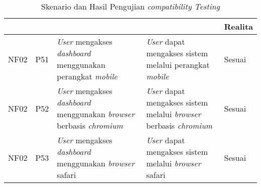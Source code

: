 \bgroup
\begin{table}[ht]
  \def\arraystretch{1.3}
  \caption{Skenario dan Hasil Pengujian \textit{compatibility Testing}}
  \label{tab:pengujian-nonfungsional-compatibility}
  \centering
  \begin{tabular}{|p{2cm}|p{2cm}|p{3cm}|p{3cm}|p{1.5cm}|}
    \hline
    \centering{ID Fungsional} & \centering{ID Pengujian} & \centering{Skenario}                                                                               & \centering{Ekspektasi}                                                                   & Realita \\
    \hline
    NF02                      & P51                      & \textit{User} mengakses \textit{dashboard} menggunakan perangkat \textit{mobile}                   & \textit{User} dapat mengakses sistem melalui perangkat \textit{mobile}                   & Sesuai  \\
    \hline
    NF02                      & P52                      & \textit{User} mengakses \textit{dashboard} menggunakan \textit{browser} berbasis \textit{chromium} & \textit{User} dapat mengakses sistem melalui \textit{browser} berbasis \textit{chromium} & Sesuai  \\
    \hline
    NF02                      & P53                      & \textit{User} mengakses \textit{dashboard} menggunakan \textit{browser} safari                     & \textit{User} dapat mengakses sistem melalui \textit{browser} safari                     & Sesuai  \\
    \hline
  \end{tabular}
\end{table}
\egroup